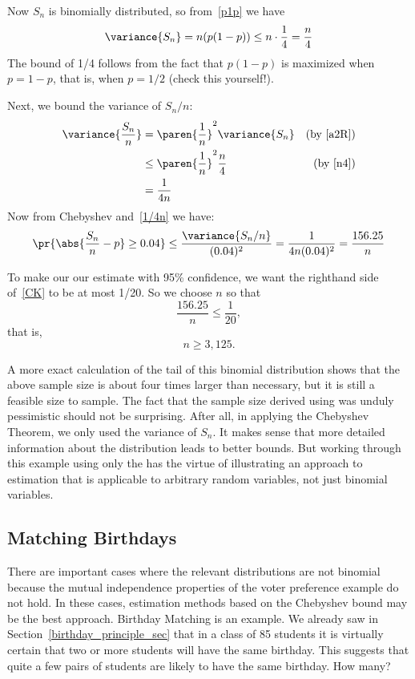Now $S_n$ is binomially distributed, so from~\eqref{p1p} we have
\[
\variance{S_n}  = n(p(1-p)) \leq n \cdot \frac{1}{4} = \frac{n}{4}\label{n4}
\]
The bound of 1/4 follows from the fact that $p(1-p)$ is maximized when $p
= 1-p$, that is, when $p=1/2$ (check this yourself!).

Next, we bound the variance of $S_n/n$:
\begin{align}
\variance{\frac{S_n}{n}}
       & = \paren{\frac{1}{n}}^2 \variance{S_n}
                     & \text{(by~\eqref{a2R})}\notag\\
       & \leq \paren{\frac{1}{n}}^2 \frac{n}{4} & \text{(by~\eqref{n4})}\notag\\
       & = \frac{1}{4n}\label{1/4n}
\end{align}
Now from Chebyshev and~\eqref{1/4n} we have:
\begin{equation}\label{CK}
\pr{\abs{\frac{S_n}{n} - p} \geq 0.04}
    \leq \frac{\variance{S_n/n}}{(0.04)^2}
       = \frac{1}{4n(0.04)^2} = \frac{156.25}{n}
\end{equation}

To make our our estimate with  95\% confidence, we want the righthand
side of~\eqref{CK} to be at most 1/20.  So we choose $n$ so that
\[
\frac{156.25}{n} \leq \frac{1}{20},
\]
that is,
\[
n \geq 3,125.
\]

A more exact calculation of the tail of this binomial distribution
shows that the above sample size is about four times larger than
necessary, but it is still a feasible size to sample.  The fact that
the sample size derived using  was unduly
pessimistic should not be surprising.  After all, in applying the
Chebyshev Theorem, we only used the variance of $S_n$.  It makes sense
that more detailed information about the distribution leads to better
bounds.  But working through this example using only the
 has the virtue of illustrating an approach to
estimation that is applicable to arbitrary random variables, not just
binomial variables.

\subsection{Matching Birthdays}\label{bday_deviation_subsec}

There are important cases where the relevant distributions are not
binomial because the mutual independence properties of the voter
preference example do not hold.  In these cases, estimation methods
based on the Chebyshev bound may be the best approach.  Birthday
Matching is an example.  We already saw in
Section~\ref{birthday_principle_sec} that in a class of 85 students it
is virtually certain that two or more students will have the same
birthday.  This suggests that quite a few pairs of students are likely
to have the same birthday.  How many?

